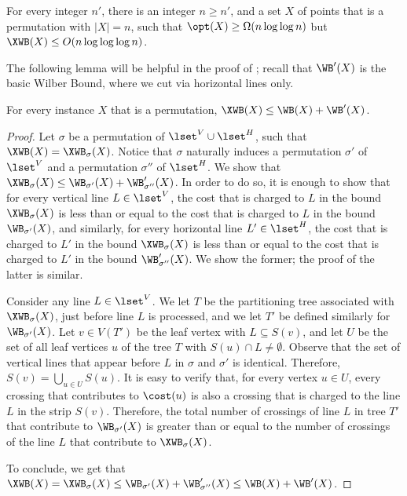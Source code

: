 %


\begin{theorem}
	\label{thm:negative for XWB}
	For every integer $n'$, there is an integer $n\geq n'$, and a set $X$ of points that is a permutation with $|X|=n$, such that $\opt(X)\geq \Omega(n\log\log n)$ but $\XWB(X)\leq O(n\log\log\log n)$.
\end{theorem}


%

%
%

The following lemma will be helpful in the proof of ; recall that $\WB'(X)$ is the basic Wilber Bound, where we cut via horizontal lines only.

\begin{lemma}\label{lem: extended WB from vertical and horizontal}
	For every instance $X$ that is a permutation, $\XWB(X)\leq \WB(X)+\WB'(X)$.
\end{lemma}

\begin{proof}
	Let $\sigma$ be a permutation of $\lset^V\cup \lset^H$, such that $\XWB(X)=\XWB_{\sigma}(X)$. Notice that $\sigma$ naturally induces a permutation $\sigma'$ of $\lset^V$ and a permutation $\sigma''$ of $\lset^H$. We show that $\XWB_{\sigma}(X)\leq \WB_{\sigma'}(X)+\WB'_{\sigma''}(X)$. In order to do so, it is enough to show that for every vertical line $L\in \lset^V$, the cost that is charged to $L$ in the bound $\XWB_{\sigma}(X)$ is less than or equal to the cost that is charged to $L$ in the bound $\WB_{\sigma'}(X)$, and similarly, for every horizontal line $L'\in \lset^H$, the cost that is charged to $L'$ in the bound $\XWB_{\sigma}(X)$ is less than or equal to the cost that is charged to $L'$ in the bound $\WB'_{\sigma''}(X)$. We show the former; the proof of the latter is similar.
	
	Consider any line $L\in \lset^V$. We let $T$ be the partitioning tree associated with $\XWB_{\sigma}(X)$, just before line $L$ is processed, and we let $T'$ be defined similarly for $\WB_{\sigma'}(X)$. Let $v\in V(T')$ be the leaf vertex with $L\subseteq S(v)$, and let $U$ be the set of all leaf vertices $u$ of the tree $T$ with $S(u)\cap L\neq \emptyset$. Observe that the set of vertical lines that appear before $L$ in $\sigma$ and $\sigma'$ is identical. Therefore, $S(v)=\bigcup_{u\in U}S(u)$. It is easy to verify that, for every vertex $u\in U$, every crossing that contributes to $\cost(u)$ is also a crossing that is charged to the line $L$ in the strip $S(v)$. Therefore, the total number of crossings of line $L$ in tree $T'$ that contribute to $\WB_{\sigma'}(X)$ is greater than or equal to the number of crossings of the line $L$ that contribute to $\XWB_{\sigma}(X)$.
	
	To conclude, we get that $\XWB(X)=\XWB_{\sigma}(X)\leq \WB_{\sigma'}(X)+\WB'_{\sigma''}(X)\leq \WB(X)+\WB'(X)$.
\end{proof}
 

